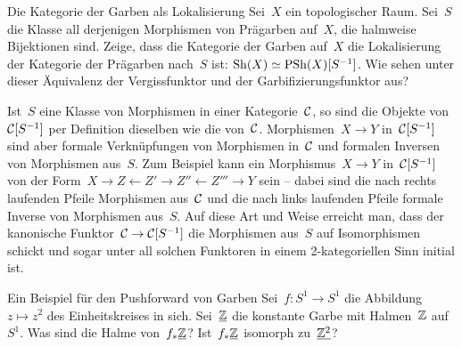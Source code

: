\documentclass{uebblatt}
\begin{document}
\begin{aufgabe}{Die Kategorie der Garben als Lokalisierung}
Sei~$X$ ein topologischer Raum. Sei~$S$ die Klasse all
derjenigen Morphismen von Prägarben auf~$X$, die halmweise Bijektionen sind.
Zeige, dass die Kategorie der Garben auf~$X$ die Lokalisierung der Kategorie
der Prägarben nach~$S$ ist: $\mathrm{Sh}(X) \simeq \mathrm{PSh}(X)[S^{-1}]$. Wie sehen unter
dieser Äquivalenz der Vergissfunktor und der Garbifizierungsfunktor aus?

{\scriptsize Ist~$S$ eine Klasse von Morphismen in einer Kategorie~$\mathcal{C}$, so
sind die Objekte von~$\mathcal{C}[S^{-1}]$ per Definition dieselben wie die von~$\mathcal{C}$.
Morphismen~$X \to Y$ in~$\mathcal{C}[S^{-1}]$ sind aber formale Verknüpfungen von
Morphismen in~$\mathcal{C}$ und formalen Inversen von Morphismen aus~$S$. Zum Beispiel
kann ein Morphismus~$X \to Y$ in~$\mathcal{C}[S^{-1}]$ von der Form~$X \to Z \leftarrow
Z' \to Z'' \leftarrow Z''' \to Y$ sein -- dabei sind die nach rechts laufenden
Pfeile Morphismen aus~$\mathcal{C}$ und die nach links laufenden Pfeile formale Inverse
von Morphismen aus~$S$. Auf diese Art und Weise erreicht man, dass der
kanonische Funktor~$\mathcal{C} \to \mathcal{C}[S^{-1}]$ die Morphismen aus~$S$ auf Isomorphismen
schickt und sogar unter all solchen Funktoren in einem 2-kategoriellen Sinn initial ist.
\par}
\end{aufgabe}

\begin{aufgabe}{Ein Beispiel für den Pushforward von Garben}
Sei~$f : S^1 \to S^1$ die Abbildung~$z \mapsto z^2$ des Einheitskreises in
sich. Sei~$\underline{\mathbb{Z}}$ die konstante Garbe mit Halmen~$\mathbb{Z}$ auf~$S^1$. Was sind
die Halme von~$f_*\underline{\mathbb{Z}}$? Ist~$f_*\underline{\mathbb{Z}}$ isomorph zu~$\underline{\mathbb{Z}^2}$?
\end{aufgabe}

\end{document}
